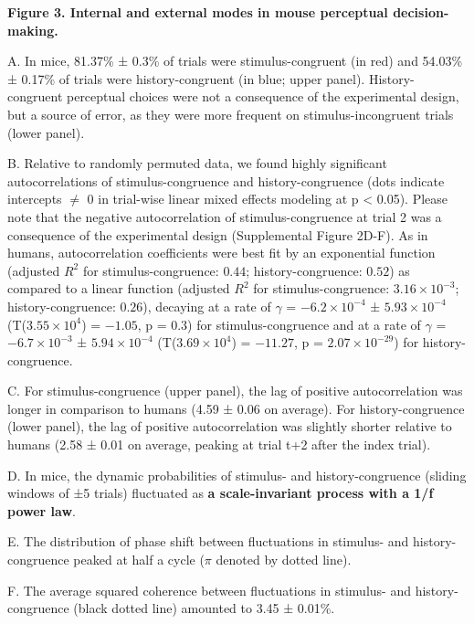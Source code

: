 \documentclass[
]{article}
\begin{document}
\textbf{Figure 3. Internal and external modes in mouse perceptual
decision-making.}

A. In mice, 81.37\% ± 0.3\% of trials were stimulus-congruent (in red)
and 54.03\% ± 0.17\% of trials were history-congruent (in blue; upper
panel). History-congruent perceptual choices were not a consequence of
the experimental design, but a source of error, as they were more
frequent on stimulus-incongruent trials (lower panel).

B. Relative to randomly permuted data, we found highly significant
autocorrelations of stimulus-congruence and history-congruence (dots
indicate intercepts \(\neq\) 0 in trial-wise linear mixed effects
modeling at p \textless{} 0.05). Please note that the negative
autocorrelation of stimulus-congruence at trial 2 was a consequence of
the experimental design (Supplemental Figure 2D-F). As in humans,
autocorrelation coefficients were best fit by an exponential function
(adjusted \(R^2\) for stimulus-congruence: \(0.44\); history-congruence:
\(0.52\)) as compared to a linear function (adjusted \(R^2\) for
stimulus-congruence: \(\ensuremath{3.16\times 10^{-3}}\);
history-congruence: \(0.26\)), decaying at a rate of \(\gamma\) =
\(\ensuremath{-6.2\times 10^{-4}}\) ±
\(\ensuremath{5.93\times 10^{-4}}\)
(T(\(\ensuremath{3.55\times 10^{4}}\)) = \(-1.05\), p = \(0.3\)) for
stimulus-congruence and at a rate of \(\gamma\) =
\(\ensuremath{-6.7\times 10^{-3}}\) ±
\(\ensuremath{5.94\times 10^{-4}}\)
(T(\(\ensuremath{3.69\times 10^{4}}\)) = \(-11.27\), p =
\(\ensuremath{2.07\times 10^{-29}}\)) for history-congruence.

C. For stimulus-congruence (upper panel), the lag of positive
autocorrelation was longer in comparison to humans (4.59 ± 0.06 on
average). For history-congruence (lower panel), the lag of positive
autocorrelation was slightly shorter relative to humans (2.58 ± 0.01 on
average, peaking at trial t+2 after the index trial).

D. In mice, the dynamic probabilities of stimulus- and
history-congruence (sliding windows of ±5 trials) fluctuated as
\textbf{a scale-invariant process with a 1/f power law}.

E. The distribution of phase shift between fluctuations in stimulus- and
history-congruence peaked at half a cycle (\(\pi\) denoted by dotted
line).

F. The average squared coherence between fluctuations in stimulus- and
history-congruence (black dotted line) amounted to 3.45 ± 0.01\%.
\end{document}
